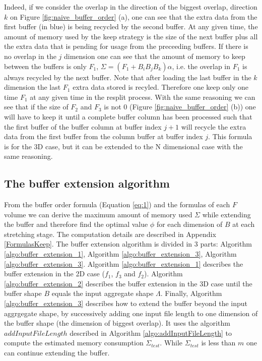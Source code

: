 \documentclass[conference]{IEEEtran}
\begin{document}
Indeed, if we consider the overlap in the direction of the biggest overlap, direction $k$ on Figure \ref{fig:naive_buffer_order} (a), one can see that the extra data from the first buffer (in blue) is being recycled by the second buffer.
At any given time, the amount of memory used by the keep strategy is the size of the next buffer plus all the extra data that is pending for usage from the preceeding buffers.
If there is no overlap in the $j$ dimension one can see that the amount of memory to keep between the buffers is only $F_1$,
$\Sigma = (F_1 + B_iB_jB_k)\alpha$,
i.e. the overlap in $F_1$ is always recycled by the next buffer.
Note that after loading the last buffer in the $k$ dimension the last $F_1$ extra data stored is recyled.
Therefore one keep only one time $F_1$ at any given time in the resplit process.
With the same reasoning we can see that if the size of $F_2$ and $F_3$ is not 0 (Figure \ref{fig:naive_buffer_order} (b)) one will have to keep it until a complete buffer column has been processed such that the first buffer of the buffer column at buffer index $j+1$ will recycle the extra data from the first buffer from the column buffer at buffer index $j$.
This formula is for the 3D case, but it can be extended to the N dimensional case with the same reasoning.

\subsection{The buffer extension algorithm}
From the buffer order formula (Equation \ref{eq:1}) and the formulas of each $F$ volume we can derive the maximum amount of memory used $\Sigma$ while extending the buffer and therefore find the optimal value $\phi$ for each dimension of $B$ at each stretching stage.
The computation details are described in Appendix \ref{FormulasKeep}.
The buffer extension algorithm is divided in 3 parts: Algorithm \ref{algo:buffer_extension_1}, Algorithm \ref{algo:buffer_extension_3}, Algorithm \ref{algo:buffer_extension_3}.
Algorithm \ref{algo:buffer_extension_1} describes the buffer extension in the 2D case ($f_1$, $f_3$ and $f_2$).
Algorithm \ref{algo:buffer_extension_2} describes the buffer extension in the 3D case until the buffer shape $B$ equals the input aggregate shape $\Lambda$.
Finally, Algorithm \ref{algo:buffer_extension_3} describes how to extend the buffer beyond the input aggrgegate shape, by successively adding one input file length to one dimension of the buffer shape (the dimension of biggest overlap). It uses the algorithm $addInputFileLength$ described in Algorithm \ref{algo:addInputFileLength} to compute the estimated memory consumption $\Sigma_{test}$. While $\Sigma_{test}$ is less than $m$ one can continue extending the buffer.
\end{document}
